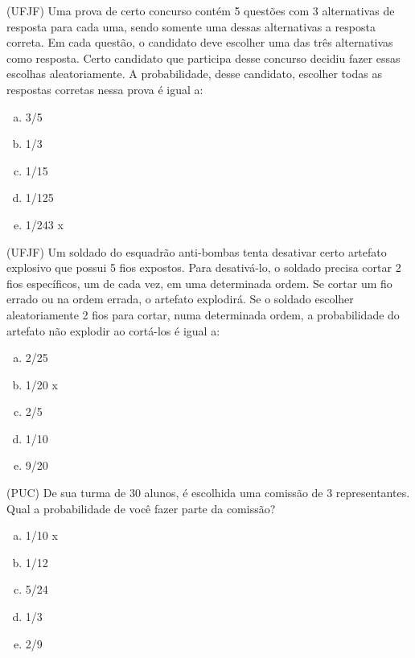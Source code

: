 \item (UFJF) Uma prova de certo concurso contém 5 questões com 3 alternativas de resposta para cada uma, sendo somente uma dessas alternativas a resposta correta. Em cada questão, o candidato deve escolher uma das três alternativas como resposta. Certo candidato que participa desse concurso decidiu fazer essas escolhas aleatoriamente. A probabilidade, desse candidato, escolher todas as respostas corretas nessa prova é igual a:
\begin{multicols}{5}
\begin{enumerate}[a)]
	\item 3/5
	\item 1/3
	\item 1/15
	\item 1/125
	\item 1/243  x
\end{enumerate}
\end{multicols}

\item (UFJF) Um soldado do esquadrão anti-bombas tenta desativar certo artefato explosivo que possui 5 fios expostos. Para desativá-lo, o soldado precisa cortar 2 fios específicos, um de cada vez, em uma determinada ordem. Se cortar um fio errado ou na ordem errada, o artefato explodirá. Se o soldado escolher aleatoriamente 2 fios para cortar, numa determinada ordem, a probabilidade do artefato não explodir ao cortá-los é igual a:
\begin{multicols}{5}
\begin{enumerate}[a)]
	\item 2/25
	\item 1/20  x
	\item 2/5
	\item 1/10
	\item 9/20
\end{enumerate}
\end{multicols}

\item (PUC) De sua turma de 30 alunos, é escolhida uma comissão de 3 representantes. Qual a probabilidade de você fazer parte da comissão?
\begin{multicols}{5}
\begin{enumerate}[a)]
	\item 1/10  x
	\item 1/12
	\item 5/24
	\item 1/3
	\item 2/9
\end{enumerate}
\end{multicols}

